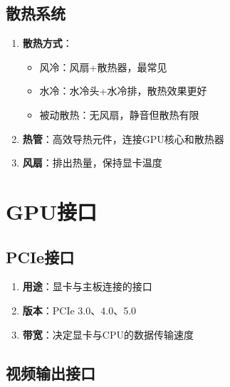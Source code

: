 \documentclass[12pt,UTF8]{ctexbook}
\begin{document}
\section{散热系统}

\begin{enumerate}
    \item \textbf{散热方式}：
    \begin{itemize}[leftmargin=2em]
        \item 风冷：风扇+散热器，最常见
        \item 水冷：水冷头+水冷排，散热效果更好
        \item 被动散热：无风扇，静音但散热有限
    \end{itemize}
    
    \item \textbf{热管}：高效导热元件，连接GPU核心和散热器
    \item \textbf{风扇}：排出热量，保持显卡温度
\end{enumerate}

\chapter{GPU接口}

\section{PCIe接口}

\begin{enumerate}
    \item \textbf{用途}：显卡与主板连接的接口
    \item \textbf{版本}：PCIe 3.0、4.0、5.0
    \item \textbf{带宽}：决定显卡与CPU的数据传输速度
\end{enumerate}

\section{视频输出接口}
\end{document}
